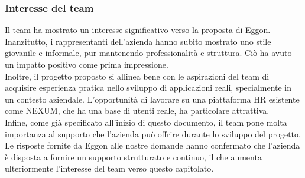 \documentclass[a4paper,11pt]{article}
\begin{document}
\subsubsection{Interesse del team}
\parbox[t]{\linewidth}{%
Il team ha mostrato un interesse significativo verso la proposta di Eggon. Inanzitutto, i rappresentanti dell'azienda hanno subito mostrato uno stile giovanile e informale, pur mantenendo professionalità e struttura. Ciò ha avuto un impatto positivo come prima impressione. \\Inoltre, il progetto proposto si allinea bene con le aspirazioni del team di acquisire esperienza pratica nello sviluppo di applicazioni reali, specialmente in un contesto aziendale. L'opportunità di lavorare su una piattaforma HR esistente come NEXUM, che ha una base di utenti reale, ha particolare attrattiva.\\ Infine, come già specificato all'inizio di questo documento, il team pone molta importanza al supporto che l'azienda può offrire durante lo sviluppo del progetto. Le risposte fornite da Eggon alle nostre domande hanno confermato che l'azienda è disposta a fornire un supporto strutturato e continuo, il che aumenta ulteriormente l'interesse del team verso questo capitolato.
}
\end{document}
